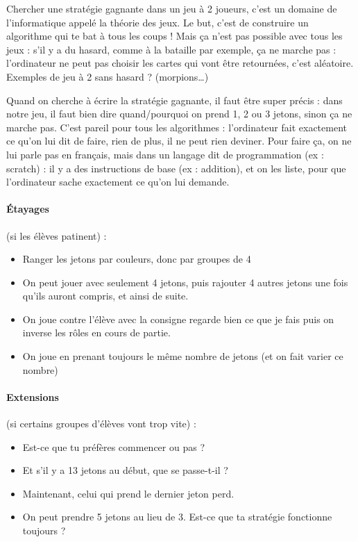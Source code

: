 \documentclass[12pt, a4paper]{article}
\begin{document}
	Chercher une stratégie gagnante dans un jeu à 2 joueurs, c’est un domaine de l’informatique appelé la théorie des jeux. Le but, c’est de construire un algorithme qui te bat à tous les coups ! Mais ça n’est pas possible avec tous les jeux : s’il y a du hasard, comme à la bataille par exemple, ça ne marche pas : l’ordinateur ne peut pas choisir les cartes qui vont être retournées, c’est aléatoire. Exemples de jeu à 2 sans hasard ? (morpions…)
	
	Quand on cherche à écrire la stratégie gagnante, il faut être super précis : dans notre jeu, il faut bien dire quand/pourquoi on prend 1, 2 ou 3 jetons, sinon ça ne marche pas. C’est pareil pour tous les algorithmes : l’ordinateur fait exactement ce qu’on lui dit de faire, rien de plus, il ne peut rien deviner. Pour faire ça, on ne lui parle pas en français, mais dans un langage dit de programmation (ex : scratch) : il y a des instructions de base (ex : addition), et on les liste, pour que l’ordinateur sache exactement ce qu’on lui demande.
	
	\paragraph*{Étayages} (si les élèves patinent) :
	\begin{itemize}
		\item Ranger les jetons par couleurs, donc par groupes de 4
		\item On peut jouer avec seulement 4 jetons, puis rajouter 4 autres jetons une fois qu'ils auront compris,
		et ainsi de suite.
		\item On joue contre l'élève
		avec la consigne \og regarde bien ce que je fais\fg{}
		puis on inverse les rôles en cours de partie.
		\item On joue en prenant toujours le même nombre de jetons (et on fait varier ce nombre)
	\end{itemize}
	
	\paragraph*{Extensions} (si certains groupes d'élèves vont trop vite) :
	\begin{itemize}
		\item Est-ce que tu préfères commencer ou pas ?
		\item Et s'il y a 13 jetons au début, que se passe-t-il ?
		\item Maintenant, celui qui prend le dernier jeton perd.
		\item On peut prendre 5 jetons au lieu de 3. Est-ce que ta stratégie fonctionne toujours ?
	\end{itemize}
\end{document}
